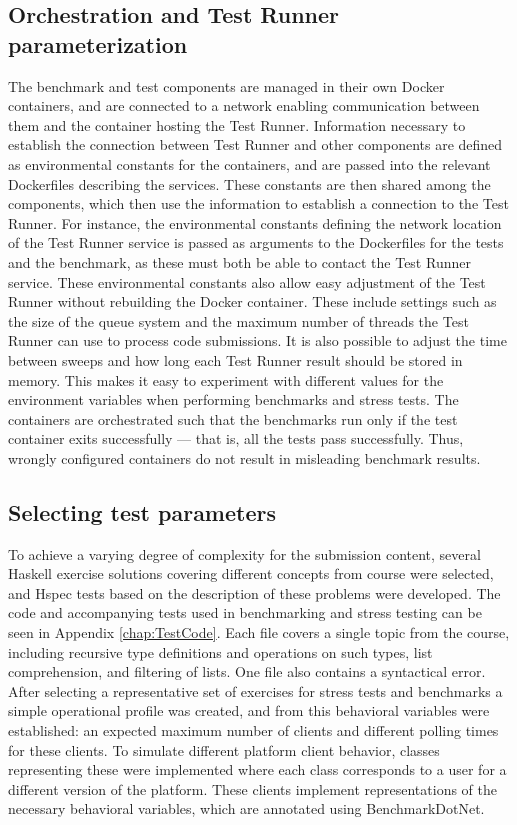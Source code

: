 \subsection{Orchestration and Test Runner parameterization}
The benchmark and test components are managed in their own Docker containers, and are connected to a network enabling communication between them and the container hosting the Test Runner.
Information necessary to establish the connection between Test Runner and other components are defined as environmental constants for the containers, and are passed into the relevant Dockerfiles describing the services.
These constants are then shared among the components, which then use the information to establish a connection to the Test Runner.
For instance, the environmental constants defining the network location of the Test Runner service is passed as arguments to the Dockerfiles for the tests and the benchmark, as these must both be able to contact the Test Runner service.
These environmental constants also allow easy adjustment of the Test Runner without rebuilding the Docker container.
These include settings such as the size of the queue system and the maximum number of threads the Test Runner can use to process code submissions.
It is also possible to adjust the time between sweeps and how long each Test Runner result should be stored in memory.
This makes it easy to experiment with different values for the environment variables when performing benchmarks and stress tests.
The containers are orchestrated such that the benchmarks run only if the test container exits successfully --- that is, all the tests pass successfully.
Thus, wrongly configured containers do not result in misleading benchmark results.

\subsection{Selecting test parameters}
To achieve a varying degree of complexity for the submission content, several Haskell exercise solutions covering different concepts from course were selected, and Hspec tests based on the description of these problems were developed.
The code and accompanying tests used in benchmarking and stress testing can be seen in Appendix \ref{chap:TestCode}.
Each file covers a single topic from the course, including recursive type definitions and operations on such types, list comprehension, and filtering of lists.
One file also contains a syntactical error.
After selecting a representative set of exercises for stress tests and benchmarks a simple operational profile was created, and from this behavioral variables were established: an expected maximum number of clients and different polling times for these clients.
To simulate different platform client behavior, classes representing these were implemented where each class corresponds to a user for a different version of the platform.
These clients implement representations of the necessary behavioral variables, which are annotated using BenchmarkDotNet.

